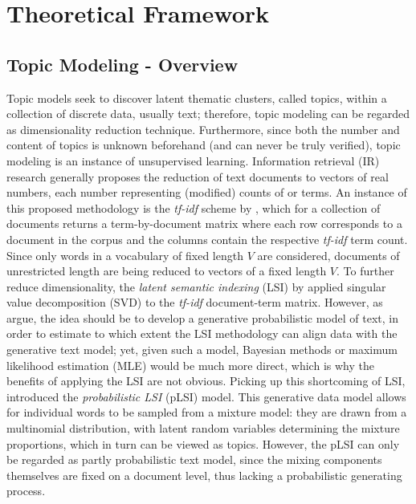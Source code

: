 \section{Theoretical Framework}
\label{Theoretical Framework}

\subsection{Topic Modeling - Overview}
\label{Topic Modeling - Overview}

Topic models seek to discover latent thematic clusters, called topics, within a collection of discrete data, usually text; therefore, topic modeling can be regarded as dimensionality reduction technique. Furthermore, since both the number and content of topics is unknown beforehand (and can never be truly verified), topic modeling is an instance of unsupervised learning. Information retrieval (IR) research generally proposes the reduction of text documents to vectors of real numbers, each number representing (modified) counts of or terms. An instance of this proposed methodology is the \textit{tf-idf} scheme by \cite{salton1983information}, which for a collection of documents returns a term-by-document matrix where each row corresponds to a document in the corpus and the columns contain the respective \textit{tf-idf} term count. Since only words in a vocabulary of fixed length $V$ are considered, documents of unrestricted length are being reduced to vectors of a fixed length $V$. To further reduce dimensionality, the \textit{latent semantic indexing} (LSI) by \cite{deerwester1990indexing} applied singular value decomposition (SVD) to the \textit{tf-idf} document-term matrix. However, as \cite{blei2003latent} argue, the idea should be to develop a generative probabilistic model of text, in order to estimate to which extent the LSI methodology can align data with the generative text model; yet, given such a model, Bayesian methods or maximum likelihood estimation (MLE) would be much more direct, which is why the benefits of applying the LSI are not obvious. Picking up this shortcoming of LSI, \cite{hofmann1999probabilistic} introduced the \textit{probabilistic LSI} (pLSI) model. This generative data model allows for individual words to be sampled from a mixture model: they are drawn from a multinomial distribution, with latent random variables determining the mixture proportions, which in turn can be viewed as topics. However, the pLSI can only be regarded as partly probabilistic text model, since the mixing components themselves are fixed on a document level, thus lacking a probabilistic generating process.

